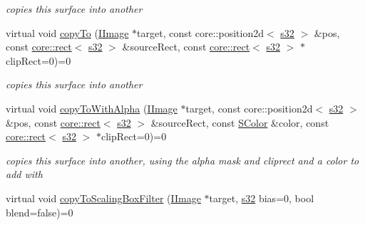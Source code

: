 \begin{DoxyCompactItemize}
\begin{DoxyCompactList}\small\item\em copies this surface into another \end{DoxyCompactList}\item 
virtual void \hyperlink{classirr_1_1video_1_1IImage_ac43f477f9da28077fc3573a628b33bcb}{copy\+To} (\hyperlink{classirr_1_1video_1_1IImage}{I\+Image} $\ast$target, const core\+::position2d$<$ \hyperlink{namespaceirr_ac66849b7a6ed16e30ebede579f9b47c6}{s32} $>$ \&pos, const \hyperlink{classirr_1_1core_1_1rect}{core\+::rect}$<$ \hyperlink{namespaceirr_ac66849b7a6ed16e30ebede579f9b47c6}{s32} $>$ \&source\+Rect, const \hyperlink{classirr_1_1core_1_1rect}{core\+::rect}$<$ \hyperlink{namespaceirr_ac66849b7a6ed16e30ebede579f9b47c6}{s32} $>$ $\ast$clip\+Rect=0)=0\hypertarget{classirr_1_1video_1_1IImage_ac43f477f9da28077fc3573a628b33bcb}{}\label{classirr_1_1video_1_1IImage_ac43f477f9da28077fc3573a628b33bcb}

\begin{DoxyCompactList}\small\item\em copies this surface into another \end{DoxyCompactList}\item 
virtual void \hyperlink{classirr_1_1video_1_1IImage_a7dd1e5dd19cb35be17c2fa00e38a193d}{copy\+To\+With\+Alpha} (\hyperlink{classirr_1_1video_1_1IImage}{I\+Image} $\ast$target, const core\+::position2d$<$ \hyperlink{namespaceirr_ac66849b7a6ed16e30ebede579f9b47c6}{s32} $>$ \&pos, const \hyperlink{classirr_1_1core_1_1rect}{core\+::rect}$<$ \hyperlink{namespaceirr_ac66849b7a6ed16e30ebede579f9b47c6}{s32} $>$ \&source\+Rect, const \hyperlink{classirr_1_1video_1_1SColor}{S\+Color} \&color, const \hyperlink{classirr_1_1core_1_1rect}{core\+::rect}$<$ \hyperlink{namespaceirr_ac66849b7a6ed16e30ebede579f9b47c6}{s32} $>$ $\ast$clip\+Rect=0)=0\hypertarget{classirr_1_1video_1_1IImage_a7dd1e5dd19cb35be17c2fa00e38a193d}{}\label{classirr_1_1video_1_1IImage_a7dd1e5dd19cb35be17c2fa00e38a193d}

\begin{DoxyCompactList}\small\item\em copies this surface into another, using the alpha mask and cliprect and a color to add with \end{DoxyCompactList}\item 
virtual void \hyperlink{classirr_1_1video_1_1IImage_a651c196f681a105fabfb5ff4f6b28682}{copy\+To\+Scaling\+Box\+Filter} (\hyperlink{classirr_1_1video_1_1IImage}{I\+Image} $\ast$target, \hyperlink{namespaceirr_ac66849b7a6ed16e30ebede579f9b47c6}{s32} bias=0, bool blend=false)=0\hypertarget{classirr_1_1video_1_1IImage_a651c196f681a105fabfb5ff4f6b28682}{}\label{classirr_1_1video_1_1IImage_a651c196f681a105fabfb5ff4f6b28682}


\end{DoxyCompactItemize}
